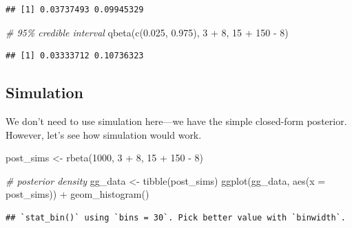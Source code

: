 \documentclass[
]{book}
\newenvironment{Shaded}{\begin{snugshade}}{\end{snugshade}}
\newcommand{\AttributeTok}[1]{\textcolor[rgb]{0.77,0.63,0.00}{#1}}
\newcommand{\CommentTok}[1]{\textcolor[rgb]{0.56,0.35,0.01}{\textit{#1}}}
\newcommand{\DecValTok}[1]{\textcolor[rgb]{0.00,0.00,0.81}{#1}}
\newcommand{\FloatTok}[1]{\textcolor[rgb]{0.00,0.00,0.81}{#1}}
\newcommand{\FunctionTok}[1]{\textcolor[rgb]{0.00,0.00,0.00}{#1}}
\newcommand{\NormalTok}[1]{#1}
\newcommand{\OtherTok}[1]{\textcolor[rgb]{0.56,0.35,0.01}{#1}}
\newcommand{\SpecialCharTok}[1]{\textcolor[rgb]{0.00,0.00,0.00}{#1}}
\begin{document}
\begin{verbatim}
## [1] 0.03737493 0.09945329
\end{verbatim}

\begin{Shaded}
\begin{Highlighting}[]
\CommentTok{\# 95\% credible interval}
\FunctionTok{qbeta}\NormalTok{(}\FunctionTok{c}\NormalTok{(}\FloatTok{0.025}\NormalTok{, }\FloatTok{0.975}\NormalTok{), }\DecValTok{3} \SpecialCharTok{+} \DecValTok{8}\NormalTok{, }\DecValTok{15} \SpecialCharTok{+} \DecValTok{150} \SpecialCharTok{{-}} \DecValTok{8}\NormalTok{)}
\end{Highlighting}
\end{Shaded}

\begin{verbatim}
## [1] 0.03333712 0.10736323
\end{verbatim}

\hypertarget{simulation}{%
\subsection{Simulation}\label{simulation}}

We don't need to use simulation here---we have the simple closed-form posterior. However, let's see how simulation would work.

\begin{Shaded}
\begin{Highlighting}[]
\NormalTok{post\_sims }\OtherTok{\textless{}{-}} \FunctionTok{rbeta}\NormalTok{(}\DecValTok{1000}\NormalTok{, }\DecValTok{3} \SpecialCharTok{+} \DecValTok{8}\NormalTok{, }\DecValTok{15} \SpecialCharTok{+} \DecValTok{150} \SpecialCharTok{{-}} \DecValTok{8}\NormalTok{)}

\CommentTok{\# posterior density}
\NormalTok{gg\_data }\OtherTok{\textless{}{-}} \FunctionTok{tibble}\NormalTok{(post\_sims)}
\FunctionTok{ggplot}\NormalTok{(gg\_data, }\FunctionTok{aes}\NormalTok{(}\AttributeTok{x =}\NormalTok{ post\_sims)) }\SpecialCharTok{+} 
  \FunctionTok{geom\_histogram}\NormalTok{()}
\end{Highlighting}
\end{Shaded}

\begin{verbatim}
## `stat_bin()` using `bins = 30`. Pick better value with `binwidth`.
\end{verbatim}
\end{document}
